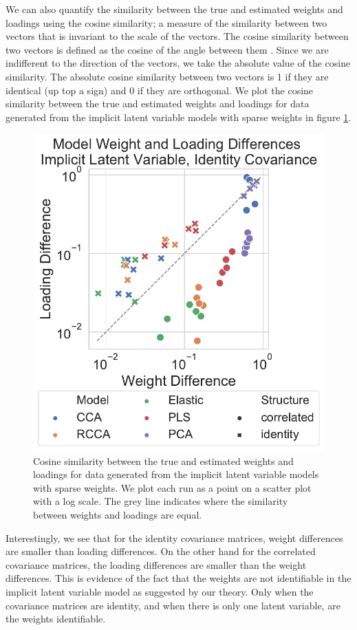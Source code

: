 We can also quantify the similarity between the true and estimated weights and \gls{loadings} using the cosine similarity; a measure of the similarity between two vectors that is invariant to the scale of the vectors.
The cosine similarity between two vectors is defined as the cosine of the angle between them \citep{luo2018cosine}.
Since we are indifferent to the direction of the vectors, we take the absolute value of the cosine similarity.
The absolute cosine similarity between two vectors is 1 if they are identical (up top a sign) and 0 if they are orthogonal.
We plot the cosine similarity between the true and estimated weights and \gls{loadings} for data generated from the implicit latent variable models with sparse weights in figure \ref{fig:implicit-weights-loadings-cosine}.

\begin{figure}
\centering
\includegraphics[width=0.8\linewidth]{figures/simulated/implicit/weight_loading_difference}
\caption{Cosine similarity between the true and estimated weights and \gls{loadings} for data generated from the implicit latent variable models with sparse weights. We plot each run as a point on a scatter plot with a log scale. The grey line indicates where the similarity between weights and loadings are equal.}\label{fig:implicit-weights-loadings-cosine}
\end{figure}

Interestingly, we see that for the identity covariance matrices, weight differences are smaller than loading differences.
On the other hand for the correlated covariance matrices, the loading differences are smaller than the weight differences.
This is evidence of the fact that the weights are not identifiable in the implicit latent variable model as suggested by our theory.
Only when the covariance matrices are identity, and when there is only one latent variable, are the weights identifiable.

